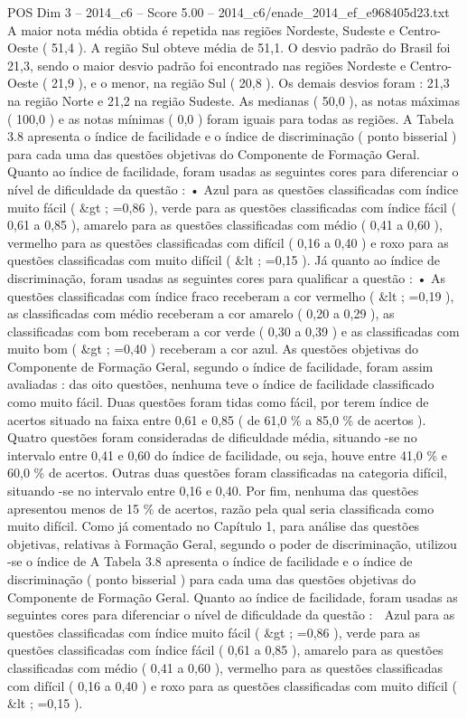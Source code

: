 \begin{textsample}{POS Dim 3 – 2014\_c6 – Score 5.00 – 2014\_c6/enade\_2014\_ef\_e968405d23.txt}
A maior nota média obtida é repetida nas regiões Nordeste, Sudeste e Centro-Oeste ( 51,4 ).
A região Sul obteve média de 51,1.
O desvio padrão do Brasil foi 21,3, sendo o maior desvio padrão foi encontrado nas regiões Nordeste e Centro-Oeste ( 21,9 ), e o menor, na região Sul ( 20,8 ).
Os demais desvios foram : 21,3 na região Norte e 21,2 na região Sudeste.
As medianas ( 50,0 ), as notas máximas ( 100,0 ) e as notas mínimas ( 0,0 ) foram iguais para todas as regiões.
A Tabela 3.8 apresenta o índice de facilidade e o índice de discriminação ( ponto bisserial ) para cada uma das questões objetivas do Componente de Formação Geral.
Quanto ao índice de facilidade, foram usadas as seguintes cores para diferenciar o nível de dificuldade da questão : • Azul para as questões classificadas com índice muito fácil ( \&gt ; =0,86 ), verde para as questões classificadas com índice fácil ( 0,61 a 0,85 ), amarelo para as questões classificadas com médio ( 0,41 a 0,60 ), vermelho para as questões classificadas com difícil ( 0,16 a 0,40 ) e roxo para as questões classificadas com muito difícil ( \&lt ; =0,15 ).
Já quanto ao índice de discriminação, foram usadas as seguintes cores para qualificar a questão : • As questões classificadas com índice fraco receberam a cor vermelho ( \&lt ; =0,19 ), as classificadas com médio receberam a cor amarelo ( 0,20 a 0,29 ), as classificadas com bom receberam a cor verde ( 0,30 a 0,39 ) e as classificadas com muito bom ( \&gt ; =0,40 ) receberam a cor azul.
As questões objetivas do Componente de Formação Geral, segundo o índice de facilidade, foram assim avaliadas : das oito questões, nenhuma teve o índice de facilidade classificado como muito fácil.
Duas questões foram tidas como fácil, por terem índice de acertos situado na faixa entre 0,61 e 0,85 ( de 61,0 \% a 85,0 \% de acertos ).
Quatro questões foram consideradas de dificuldade média, situando -se no intervalo entre 0,41 e 0,60 do índice de facilidade, ou seja, houve entre 41,0 \% e 60,0 \% de acertos.
Outras duas questões foram classificadas na categoria difícil, situando -se no intervalo entre 0,16 e 0,40.
Por fim, nenhuma das questões apresentou menos de 15 \% de acertos, razão pela qual seria classificada como muito difícil.
Como já comentado no Capítulo 1, para análise das questões objetivas, relativas à Formação Geral, segundo o poder de discriminação, utilizou -se o índice de A Tabela 3.8 apresenta o índice de facilidade e o índice de discriminação ( ponto bisserial ) para cada uma das questões objetivas do Componente de Formação Geral.
Quanto ao índice de facilidade, foram usadas as seguintes cores para diferenciar o nível de dificuldade da questão :  Azul para as questões classificadas com índice muito fácil ( \&gt ; =0,86 ), verde para as questões classificadas com índice fácil ( 0,61 a 0,85 ), amarelo para as questões classificadas com médio ( 0,41 a 0,60 ), vermelho para as questões classificadas com difícil ( 0,16 a 0,40 ) e roxo para as questões classificadas com muito difícil ( \&lt ; =0,15 ).

\end{textsample}
